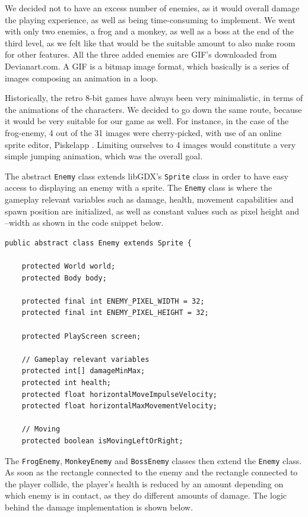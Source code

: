 \documentclass[12p]{article}
\begin{document}
We decided not to have an excess number of enemies, as it would overall damage the playing experience, as well as being time-consuming to implement. We went with only two enemies, a frog and a monkey, as well as a boss at the end of the third level, as we felt like that would be the suitable amount to also make room for other features. All the three added enemies are GIF’s downloaded from Devianart.com. A GIF is a bitmap image format, which basically is a series of images composing an animation in a loop.

Historically, the retro 8-bit games have always been very minimalistic, in terms of the animations of the characters. We decided to go down the same route, because it would be very suitable for our game as well. For instance, in the case of the frog-enemy, 4 out of the 31 images were cherry-picked, with use of an online sprite editor, Piskelapp \cite{piskelapp}. Limiting ourselves to 4 images would constitute a very simple jumping animation, which was the overall goal.

The abstract \texttt{Enemy} class extends libGDX's \texttt{Sprite} class in order to have easy access to displaying an enemy with a sprite. The \texttt{Enemy} class is where the gameplay relevant variables such as damage, health, movement capabilities and spawn position are initialized, as well as constant values such as pixel height and –width as shown in the code snippet below. 

\begin{verbatim}
public abstract class Enemy extends Sprite {

    protected World world;
    protected Body body;

    protected final int ENEMY_PIXEL_WIDTH = 32;
    protected final int ENEMY_PIXEL_HEIGHT = 32;

    protected PlayScreen screen;

    // Gameplay relevant variables
    protected int[] damageMinMax;
    protected int health;
    protected float horizontalMoveImpulseVelocity;
    protected float horizontalMaxMovementVelocity;

    // Moving
    protected boolean isMovingLeftOrRight;
\end{verbatim}

The \texttt{FrogEnemy}, \texttt{MonkeyEnemy} and \texttt{BossEnemy} classes then extend the \texttt{Enemy} class. As soon as the rectangle connected to the enemy and the rectangle connected to the player collide, the player’s health is reduced by an amount depending on which enemy is in contact, as they do different amounts of damage. The logic behind the damage implementation is shown below.
\end{document}
